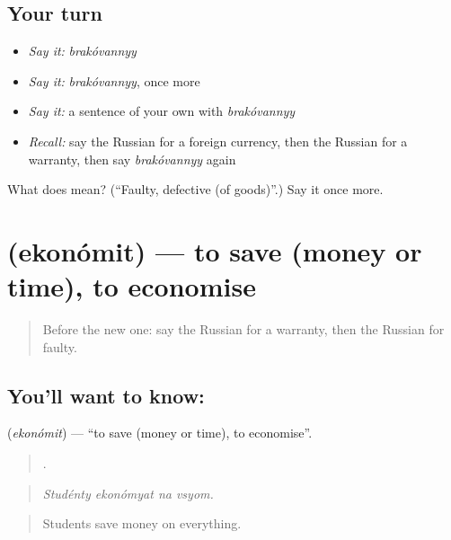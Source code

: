 \subsection*{Your turn}
\begin{itemize}
\raggedright
  \item \emph{Say it:} \emph{brakóvannyy}
  \item \emph{Say it:} \emph{brakóvannyy}, once more
  \item \emph{Say it:} a sentence of your own with \emph{brakóvannyy}
  \item \emph{Recall:} say the Russian for a foreign currency, then the Russian for a warranty, then say \emph{brakóvannyy} again
\end{itemize}

\begin{tcolorbox}[breakable,colback=teal!4,colframe=teal!35!black,title={Before you move on}]
What does  mean? (\textquotedblleft{}Faulty, defective (of goods)\textquotedblright{}.) Say it once more.
\end{tcolorbox}
\section[\texorpdfstring{\ru{экономить} (ekonómit)}{экономить (ekonómit)}]{ (ekonómit) — to save (money or time), to economise}

\label{lesson:RU-C456-ekonomit}



\begin{quote}
Before the new one: say the Russian for a warranty, then the Russian for faulty.
\end{quote}

\subsection*{You'll want to know: }
\textbf{} (\emph{ekonómit}) — \textquotedblleft{}to save (money or time), to economise\textquotedblright{}.

\begin{quote}
   .
\end{quote}

\begin{quote}
\emph{Studénty ekonómyat na vsyom.}
\end{quote}

\begin{quote}
Students save money on everything.
\end{quote}

